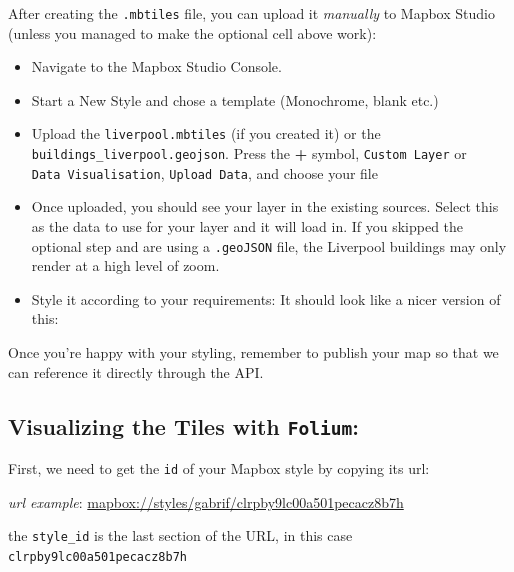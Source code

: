 \documentclass[
  letterpaper,
  DIV=11,
  numbers=noendperiod]{scrreprt}
\providecommand{\tightlist}{%
  \setlength{\itemsep}{0pt}\setlength{\parskip}{0pt}}\usepackage{longtable,booktabs,array}
\begin{document}
After creating the \texttt{.mbtiles} file, you can upload it
\emph{manually} to Mapbox Studio (unless you managed to make the
optional cell above work):

\begin{itemize}
\tightlist
\item
  Navigate to the Mapbox Studio Console.
\item
  Start a New Style and chose a template (Monochrome, blank etc.)
\end{itemize}

\begin{itemize}
\tightlist
\item
  Upload the \texttt{liverpool.mbtiles} (if you created it) or the
  \texttt{buildings\_liverpool.geojson}. Press the \textbf{+} symbol,
  \texttt{Custom\ Layer} or \texttt{Data\ Visualisation},
  \texttt{Upload\ Data}, and choose your file
\end{itemize}

\begin{itemize}
\tightlist
\item
  Once uploaded, you should see your layer in the existing sources.
  Select this as the data to use for your layer and it will load in. If
  you skipped the optional step and are using a \texttt{.geoJSON} file,
  the Liverpool buildings may only render at a high level of zoom.
\end{itemize}

\begin{itemize}
\tightlist
\item
  Style it according to your requirements: It should look like a nicer
  version of this:
\end{itemize}

Once you're happy with your styling, remember to publish your map so
that we can reference it directly through the API.

\subsection{\texorpdfstring{Visualizing the Tiles with
\texttt{Folium}:}{Visualizing the Tiles with Folium:}}\label{visualizing-the-tiles-with-folium}

First, we need to get the \texttt{id} of your Mapbox style by copying
its url:

\emph{url example}:
\url{mapbox://styles/gabrif/clrpby9lc00a501pecacz8b7h}

the \texttt{style\_id} is the last section of the URL, in this case
\texttt{clrpby9lc00a501pecacz8b7h}
\end{document}

